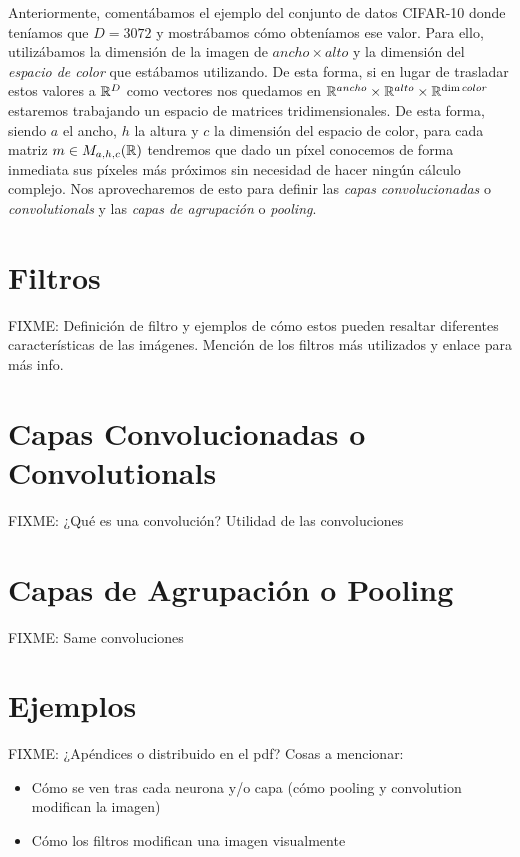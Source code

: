 Anteriormente, comentábamos el ejemplo del conjunto de datos CIFAR-10 donde teníamos que $D=3072$ y mostrábamos cómo obteníamos ese valor. Para ello, utilizábamos la dimensión de la imagen de $ancho \times alto $ y la dimensión del \emph{espacio de color} que estábamos utilizando. De esta forma, si en lugar de trasladar estos valores a $\mathbb{R}^D$ como vectores nos quedamos en $\mathbb{R}^{ancho}\times \mathbb{R}^{alto} \times \mathbb{R}^{\dim color}$ estaremos trabajando un espacio de matrices tridimensionales. De esta forma, siendo $a$ el ancho, $h$ la altura y $c$ la dimensión del espacio de color, para cada matriz $m \in M_{a, h,c}(\mathbb{R})$ tendremos que dado un píxel conocemos de forma inmediata sus píxeles más próximos sin necesidad de hacer ningún cálculo complejo. Nos aprovecharemos de esto para definir las \emph{capas convolucionadas} o \emph{convolutionals} y las \emph{capas de agrupación} o \emph{pooling}.\\

\section{Filtros}

FIXME: Definición de filtro y ejemplos de cómo estos pueden resaltar diferentes características de las imágenes. Mención de los filtros más utilizados y enlace para más info.

\section{Capas Convolucionadas o Convolutionals}

FIXME: ¿Qué es una convolución? Utilidad de las convoluciones

\section{Capas de Agrupación o Pooling}

FIXME: Same convoluciones

\section{Ejemplos}

FIXME: ¿Apéndices o distribuido en el pdf? Cosas a mencionar:

\begin{itemize}
\item Cómo se ven tras cada neurona y/o capa (cómo pooling y convolution modifican la imagen)
\item Cómo los filtros modifican una imagen visualmente
\end{itemize}

